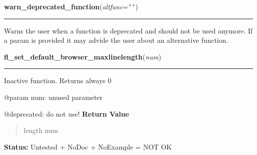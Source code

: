     \vspace{0.5ex}

\hspace{.8\funcindent}\begin{boxedminipage}{\funcwidth}

    \raggedright \textbf{warn\_deprecated\_function}(\textit{altfunc}={\tt \texttt{'}\texttt{}\texttt{'}})

    \vspace{-1.5ex}

    \rule{\textwidth}{0.5\fboxrule}
\setlength{\parskip}{2ex}

Warns the user when a function is deprecated and should not be used
anymore. If a param is provided it may advide the user about an
alternative function.
\setlength{\parskip}{1ex}
    \end{boxedminipage}

    \label{xformslib:deprecated:fl_set_default_browser_maxlinelength}

    \vspace{0.5ex}

\hspace{.8\funcindent}\begin{boxedminipage}{\funcwidth}

    \raggedright \textbf{fl\_set\_default\_browser\_maxlinelength}(\textit{num})

    \vspace{-1.5ex}

    \rule{\textwidth}{0.5\fboxrule}
\setlength{\parskip}{2ex}

Inactive function. Returns always 0

@param num: unused parameter

@deprecated: do not use!
\setlength{\parskip}{1ex}
      \textbf{Return Value}
    \vspace{-1ex}

      \begin{quote}

length num
      \end{quote}

\textbf{Status:} 
Untested + NoDoc + NoExample = NOT OK


    \end{boxedminipage}

    \label{xformslib:deprecated:fl_add_choice}

